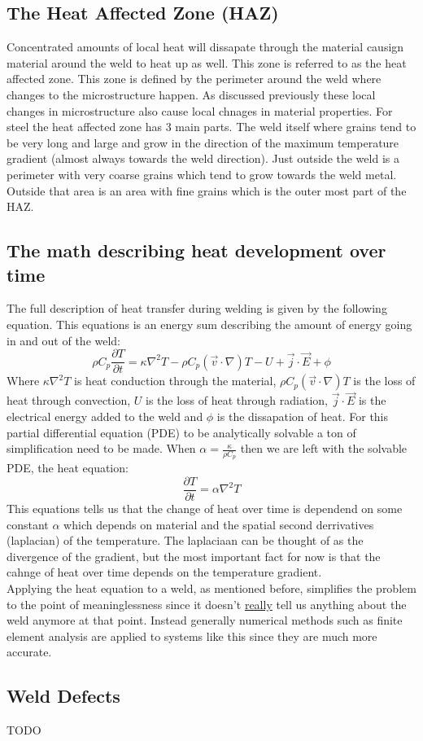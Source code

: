 \documentclass[11pt, a4paper]{article}
\begin{document}
\subsection{The Heat Affected Zone (HAZ)}
Concentrated amounts of local heat will dissapate through the material causign material around the weld to heat up as well. This zone is referred to as the heat affected zone. This zone is defined by the perimeter around the weld where changes to the microstructure happen. As discussed previously these local changes in microstructure also cause local chnages in material properties. For steel the heat affected zone has 3 main parts. The weld itself where grains tend to be very long and large and grow in the direction of the maximum temperature gradient (almost always towards the weld direction). Just outside the weld is a perimeter with very coarse grains which tend to grow towards the weld metal. Outside that area is an area with fine grains which is the outer most part of the HAZ.


\subsection{The math describing heat development over time}
The full description of heat transfer during welding is given by the following equation. This equations is an energy sum describing the amount of energy going in and out of the weld:
\begin{equation}
  \rho C_p \frac{\partial T}{\partial t} = \kappa \nabla^2 T - \rho C_p (\vec{v}\cdot \nabla)T - U + \vec{j} \cdot \vec{E} + \phi
\end{equation}
Where $\kappa \nabla^2 T$ is heat conduction through the material, $\rho C_p (\vec{v} \cdot \nabla)T$ is the loss of heat through convection, $U$ is the loss of heat through radiation, $\vec{j}\cdot \vec{E}$ is the electrical energy added to the weld and $\phi$ is the dissapation of heat. For this partial differential equation (PDE) to be analytically solvable a ton of simplification need to be made. When $\alpha = \frac{\kappa}{\rho C_p}$ then we are left with the solvable PDE, the heat equation:
\begin{equation}
  \frac{\partial T}{\partial t} = \alpha \nabla^2 T
\end{equation}
This equations tells us that the change of heat over time is dependend on some constant $\alpha$ which depends on material and the spatial second derrivatives (laplacian) of the temperature. The laplaciaan can be thought of as the divergence of the gradient, but the most important fact for now is that the cahnge of heat over time depends on the temperature gradient.\\
Applying the heat equation to a weld, as mentioned before, simplifies the problem to the point of meaninglessness since it doesn't \underline{really} tell us anything about the weld anymore at that point. Instead generally numerical methods such as finite element analysis are applied to systems like this since they are much more accurate.


\subsection{Weld Defects}
TODO
\end{document}
